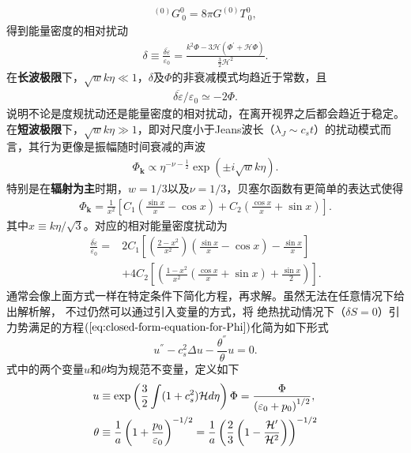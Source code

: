 \begin{align}
  ^{(0)}G^{0}_{~0} =8\pi G ^{(0)}T^{0}_{~0}, 
\end{align}
得到能量密度的相对扰动
\begin{align}
  \label{eq:gauge-invariant-relative-energy-density-perturbation}
  \delta\equiv\frac{\overline{\delta\varepsilon}}{\varepsilon_0}
  =\frac{k^2 \Phi -3\mathcal{H}{\left(\Phi^\prime+\mathcal{H}\Phi\right)}}{\frac{3}{2}\mathcal{H}^2}.
\end{align}
在\textbf{长波极限}下，$\sqrt{w}k\eta\ll
1$，$\delta$及$\Phi$的非衰减模式均趋近于常数，且
\begin{align}
  \overline{\delta\varepsilon} /\varepsilon_0\simeq -2\Phi.
\end{align}
说明不论是度规扰动还是能量密度的相对扰动，在离开视界之后都会趋近于稳定。\\
在\textbf{短波极限}下，$\sqrt{w}k\eta\gg 1$，即对尺度小于Jeans波长（$\lambda_{J}\sim
c_{s}t$）的扰动模式而言，其行为更像是振幅随时间衰减的声波
\begin{align}
  \Phi_{\mathbf{k}}\propto \eta^{-\nu-\frac{1}{2}}\exp{\left(\pm
  i\sqrt{w}k\eta\right)}. 
\end{align}
特别是在\textbf{辐射为主}时期，$w=1 /3$以及$\nu=1
/3$，贝塞尔函数有更简单的表达式使得
\begin{align}
  \label{eq:Phi-in-radiation-dominated}
  \Phi_{\mathbf{k}}=\frac{1}{x^2}{\left[
  C_1{\left(\frac{\sin x}{x}-\cos x\right)}+
  C_2{\left(\frac{\cos x}{x}+\sin x\right)}\right]}.
\end{align}
其中$x\equiv k\eta /\sqrt{3}$。对应的相对能量密度扰动为
\begin{align}
  \frac{\overline{\delta\varepsilon}}{\varepsilon_0}=
  &2C_1{\left[{\left(\frac{2-x^2}{x^2}\right)}{\left(\frac{\sin x}{x}-\cos x\right)}-\frac{\sin x}{x}\right]}
  \\
  &+4C_2{\left[{\left(\frac{1-x^2}{x^2}{\left(\frac{\cos x}{x}+\sin x\right)}+\frac{\sin x}{2}\right)}\right]}.
\end{align}
通常会像上面方式一样在特定条件下简化方程，再求解。虽然无法在任意情况下给出解析解，
不过仍然可以通过引入变量的方式，将
绝热扰动情况下（$\delta S=0$）引力势满足的方程$(\ref{eq:closed-form-equation-for-Phi})$化简为如下形式
\begin{equation}
  \label{eq:ms-like-bardeen-equation}
  u^{\dprime}-c_{s}^2\Delta u - \frac{\theta^{\dprime}}{\theta} u = 0. 
\end{equation}
式中的两个变量$u$和$\theta$均为规范不变量，定义如下
\begin{align}
  \label{eq:u-theta-defininition}
  u &\equiv \exp\left(\frac{3}{2}\int (1+c_{s}^2)\mathcal{H}d\eta\right)\Phi 
      =\frac{\Phi}{\left(\varepsilon_0+p_0\right)^{1 /2}}, \\
  \theta &\equiv \frac{1}{a}\left(1+\frac{p_0}{\varepsilon_0}\right)^{-1 /2}=
  \frac{1}{a}\left(\frac{2}{3}\left(1-\frac{\mathcal{H^\prime}}{\mathcal{H}^2}\right)\right)^{-1
  /2}
\end{align}

